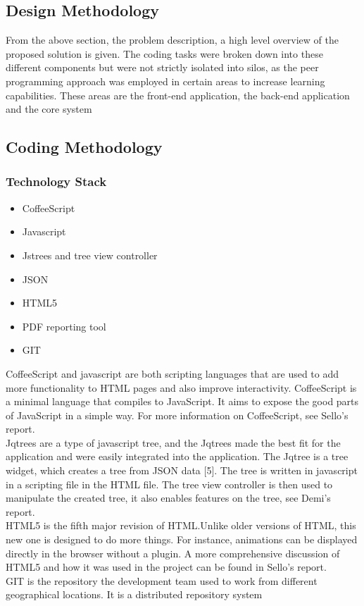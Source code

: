 \documentclass[a4paper,12pt]{Article}
\begin{document}
\subsection{Design Methodology}
From the above section, the problem description, a high level overview of the proposed solution is given. The coding tasks were broken down into these different components but were not strictly isolated into silos, as the peer programming approach was employed in certain areas to increase learning capabilities. These areas are the front-end application, the back-end application and the core system 
\subsection{Coding Methodology}
\subsubsection{Technology Stack} 
\begin{itemize}
\item CoffeeScript
\item Javascript 
\item Jstrees and tree view controller
\item JSON
\item HTML5
\item PDF reporting tool
\item GIT
\end{itemize}
CoffeeScript and javascript are both scripting languages that are used to add more functionality to HTML pages and also improve interactivity. CoffeeScript is a minimal language that compiles to JavaScript. It aims to expose the good parts of JavaScript in a simple way. For more information on CoffeeScript, see Sello’s report.
\\Jqtrees are a type of javascript tree, and the Jqtrees made the best fit for the application and were easily integrated into the application. The Jqtree is a tree widget, which creates a tree from JSON data [5]. The tree is written in javascript  in a scripting file in the HTML file. The tree view controller is then used to manipulate the created tree, it also enables features on the tree, see Demi's report.
\\HTML5  is the fifth major revision of HTML.Unlike older versions of HTML, this new one is designed to do more things. For instance, animations can be displayed directly in the browser without a plugin. A more comprehensive discussion of HTML5 and how it was used in the project can be found in Sello’s report.
\\GIT is the repository the development team used to work from different geographical locations. It is a distributed repository system
\end{document}
